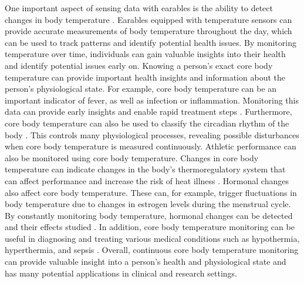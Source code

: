 One important aspect of sensing data with earables is the ability to detect changes in body temperature \cite{dolsonWearableSensorTechnology2022, bonziAccuracyPeripheralThermometers2016, NovelWearableDevice2021}. 
Earables equipped with temperature sensors can provide accurate measurements of body temperature throughout the day, which can be used to track patterns and identify potential health issues. 
By monitoring temperature over time, individuals can gain valuable insights into their health and identify potential issues early on.
Knowing a person's exact core body temperature can provide important health insights and information about the person's physiological state.
For example, core body temperature can be an important indicator of fever, as well as infection or inflammation. 
Monitoring this data can provide early insights and enable rapid treatment steps \cite{NovelWearableDevice2021}.
Furthermore, core body temperature can also be used to classify the circadian rhythm of the body \cite{liCircadianRhythmAnalysis2021, juSleepQualityPreclinical2013}.
This controls many physiological processes, revealing possible disturbances when core body temperature is measured continuously.
Athletic performance can also be monitored using core body temperature. Changes in core body temperature can indicate changes in the body's thermoregulatory system that can affect performance and increase the risk of heat illness \cite{gabbettAthleteMonitoringCycle2017, silvaSleepQualityTraining2022}.
Hormonal changes also affect core body temperature. 
These can, for example, trigger fluctuations in body temperature due to changes in estrogen levels during the menstrual cycle. 
By constantly monitoring body temperature, hormonal changes can be detected and their effects studied \cite{goeckenjanContinuousBodyTemperature2020, charkoudianAutonomicControlBody2017, hamataniEstimatingCoreBody2015}.
In addition, core body temperature monitoring can be useful in diagnosing and treating various medical conditions such as hypothermia, hyperthermia, and sepsis \cite{hardingTemperatureDependenceSleep2019, guilleminaultChronicInsomniaPremenopausal2002, raymannSkinDeepEnhanced2008}.
Overall, continuous core body temperature monitoring can provide valuable insight into a person's health and physiological state and has many potential applications in clinical and research settings.

